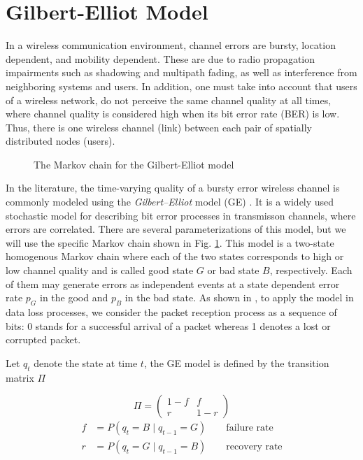 \section{Gilbert-Elliot Model}

In a wireless communication environment, channel errors are bursty, location
dependent, and mobility dependent. These are due to radio propagation
impairments such as shadowing and multipath fading, as well as interference from
neighboring systems and users. In addition, one must take into account that
users of a wireless network, do not perceive the same channel quality at all
times, where channel quality is considered high when its bit error rate (BER) is
low. Thus, there is one wireless channel (link) between each pair of spatially
distributed nodes (users). 

\begin{figure}[h]
  \centering
   
  \caption{The Markov chain for the Gilbert-Elliot model}
  \label{fig:GE_FSM}
\end{figure}

In the literature, the time-varying quality of a bursty error wireless channel
is commonly modeled using the \textit{Gilbert–Elliot} model (GE)
\cite{gilbert1960capacity}
\cite{elliott1963estimates}. It is a widely used stochastic model for describing
bit error processes in transmisson channels, where errors are correlated. There
are several parameterizations of this model, but we will use the specific Markov
chain shown in Fig. \ref{fig:GE_FSM}. This model is a two-state homogenous
Markov chain where each of the two states corresponds to high or low channel
quality and is called good state $G$ or bad state $B$, respectively. Each of them may
generate errors as independent events at a state dependent error rate $p_G$ in
the good and $p_B$ in the bad state. As shown in \cite{hasslinger2008gilbert},
to apply the model in data loss processes, we consider the packet reception
process as a sequence of bits: 0 stands for a successful arrival
of a packet whereas 1 denotes a lost or corrupted packet.

Let $q_t$ denote the state at time $t$, the GE model is defined by the
transition matrix $\Pi$

\begin{equation*}
  \Pi = \left (\begin{array}{cc} 1-f & f \\ r & 1-r \end{array} \right) 
\end{equation*}
\begin{align*}
  f &= P(q_t = B \mid q_{t-1} = G) \qquad \textrm{failure rate} \\
  r &= P(q_t = G \mid q_{t-1} = B) \qquad \textrm{recovery rate}
\end{align*}

